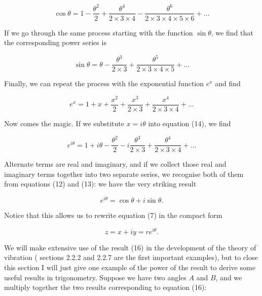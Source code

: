   \begin{equation*}\cos \theta = 1-\dfrac{\theta^2}{2}+\dfrac{\theta^4}{2 
  \times 3 \times 4}-\dfrac{\theta^6}{2 \times 3 \times 4 \times 5 \times 6} 
  +...\tag{12}\end{equation*} 

  If we go through the same process starting with the function $\sin \theta$, 
  we find that the corresponding power series is 

  \begin{equation*}\sin \theta = \theta -\dfrac{\theta^3}{2 \times 3} + 
  \dfrac{\theta^5}{2 \times 3 \times 4 \times 5}+... \tag{13}\end{equation*} 

  Finally, we can repeat the process with the exponential function $e^x$ and 
  find 

  \begin{equation*}e^x = 1+x+\dfrac{x^2}{2}+\dfrac{x^3}{2 \times 
  3}+\dfrac{x^4}{2 \times 3 \times 4}+... \tag{14}\end{equation*} 

  Now comes the magic. If we substitute $x=i\theta$ into equation (14), we find 

  \begin{equation*}e^{i \theta} = 1+i 
  \theta-\dfrac{\theta^2}{2}-i\dfrac{\theta^3}{2 \times 3}+\dfrac{\theta^4}{2 
  \times 3 \times 4}+... \tag{15}\end{equation*} 

  Alternate terms are real and imaginary, and if we collect those real and 
  imaginary terms together into two separate series, we recognise both of them 
  from equations (12) and (13): we have the very striking result 

  \begin{equation*}e^{i \theta} = \cos \theta + i \sin \theta . 
  \tag{16}\end{equation*} 

  Notice that this allows us to rewrite equation (7) in the compact form 

  \begin{equation*}z=x+iy=r e^{i \theta}. \tag{17}\end{equation*} 

  We will make extensive use of the result (16) in the development of the 
  theory of vibration ( sections 2.2.2 and 2.2.7 are the first important 
  examples), but to close this section I will just give one example of the 
  power of the result to derive some useful results in trigonometry. Suppose we 
  have two angles $A$ and $B$, and we multiply together the two results 
  corresponding to equation (16): 

